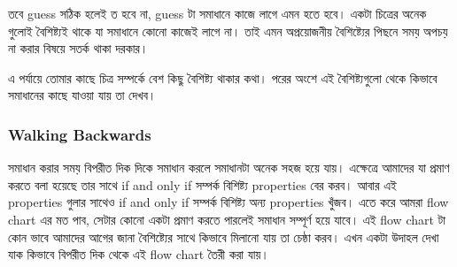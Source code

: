 \documentclass[a4paper,11pt]{article}
\begin{document}
তবে guess সঠিক হলেই ত হবে না, guess টা সমাধানে কাজে লাগে এমন হতে হবে। একটা চিত্রের অনেক গুলোই বৈশিষ্ট্যই থাকে যা সমাধানে কোনো কাজেই লাগে না। তাই এমন অপ্রয়োজনীয় বৈশিষ্ট্যের পিছনে সময় অপচয় না করার বিষয়ে সতর্ক থাকা দরকার। 

এ পর্যায়ে তোমার কাছে চিত্র সম্পর্কে বেশ কিছু বৈশিষ্ট্য থাকার কথা। পরের অংশে এই বৈশিষ্ট্যগুলো থেকে কিভাবে  সমাধানের কাছে যাওয়া যায় তা দেখব।  

\subsubsection{Walking Backwards}
সমাধান করার সময় বিপরীত দিক দিকে সমাধান করলে সমাধানটা অনেক সহজ হয়ে যায়। এক্ষেত্রে আমাদের যা প্রমাণ করতে বলা হয়েছে তার সাথে if and only if সম্পর্ক বিশিষ্ট্য properties বের করব। আবার এই properties গুলার সাথেও if and only if সম্পর্ক বিশিষ্ট্য অন্য properties খুঁজব। এতে করে আমরা flow chart এর মত পাব, সেটার কোনো একটা প্রমাণ করতে পারলেই সমাধান সম্পূর্ণ হয়ে যাবে। এই flow chart টা কোন ভাবে আমাদের আগের জানা বৈশিষ্ট্যের সাথে কিভাবে মিলানো যায় তা চেষ্ঠা করব। এখন একটা উদাহল দেখা যাক কিভাবে বিপরীত দিক থেকে এই flow chart তৈরী করা যায়।
\end{document}
